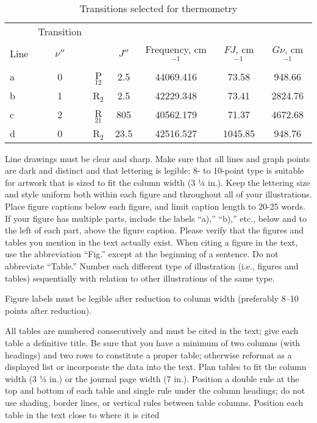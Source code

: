 \documentclass[journal]{new-aiaa}
\begin{document}
\begin{table}[hbt!]
\caption{\label{tab:table1} Transitions selected for thermometry}
\centering
\begin{tabular}{lcccccc}
\hline
& Transition& & \multicolumn{2}{c}{}\\\cline{2-2}
Line& $\nu''$& & $J'' $& Frequency, cm$^{-1}$& $FJ$, cm$^{-1}$& $G\nu $, cm$^{-1}$\\\hline
a& 0& P$_{12}$& 2.5& 44069.416& 73.58& 948.66\\
b& 1& R$_{2}$& 2.5& 42229.348& 73.41& 2824.76\\
c& 2& R$_{21}$& 805& 40562.179& 71.37& 4672.68\\
d& 0& R$_{2}$& 23.5& 42516.527& 1045.85& 948.76\\
\hline
\end{tabular}
\end{table}


Line drawings must be clear and sharp. Make sure that all lines and graph points are dark and distinct and that lettering is legible; 8- to 10-point type is suitable for artwork that is sized to fit the column width (3 ¼ in.). Keep the lettering size and style uniform both within each figure and throughout all of your illustrations. Place figure captions below each figure, and limit caption length to 20-25 words. If your figure has multiple parts, include the labels “a),” “b),” etc., below and to the left of each part, above the figure caption. Please verify that the figures and tables you mention in the text actually exist. When citing a figure in the text, use the abbreviation “Fig.” except at the beginning of a sentence. Do not abbreviate “Table.” Number each different type of illustration (i.e., figures and tables) sequentially with relation to other illustrations of the same type.

Figure labels must be legible after reduction to column width (preferably 8--10 points after reduction).

All tables are numbered consecutively and must be cited in the text; give each table a definitive title. Be sure that you have a minimum of two columns (with headings) and two rows to constitute a proper table; otherwise reformat as a displayed list or incorporate the data into the text. Plan tables to fit the column width (3 ¼ in.) or the journal page width (7 in.). Position a double rule at the top and bottom of each table and single rule under the column headings; do not use shading, border lines, or vertical rules between table columns. Position each table in the text close to where it is cited
\end{document}

